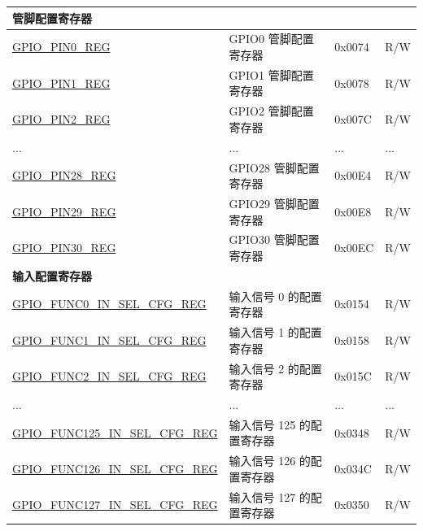 \begin{longtable}{ | p{5.8cm} | p{7.2cm} | p{1.3cm} | p{2cm} | }
\multicolumn{4}{|l|}{\textbf{管脚配置寄存器}} \\ \hline
\hyperref[regdesc:GPIOPINNREG]{GPIO\_PIN0\_REG} & GPIO0 管脚配置寄存器 & 0x0074 & R/W \\ \hline
\hyperref[regdesc:GPIOPINNREG]{GPIO\_PIN1\_REG} & GPIO1 管脚配置寄存器 & 0x0078 & R/W \\ \hline
\hyperref[regdesc:GPIOPINNREG]{GPIO\_PIN2\_REG} & GPIO2 管脚配置寄存器 & 0x007C & R/W \\ \hline
...& ... & ... & ... \\ \hline
\hyperref[regdesc:GPIOPINNREG]{GPIO\_PIN28\_REG} & GPIO28 管脚配置寄存器 & 0x00E4 & R/W \\ \hline
\hyperref[regdesc:GPIOPINNREG]{GPIO\_PIN29\_REG} & GPIO29 管脚配置寄存器 & 0x00E8 & R/W \\ \hline
\hyperref[regdesc:GPIOPINNREG]{GPIO\_PIN30\_REG} & GPIO30 管脚配置寄存器 & 0x00EC & R/W \\ \hline

\multicolumn{4}{|l|}{\textbf{输入配置寄存器}} \\ \hline
\hyperref[regdesc:GPIOFUNCNINSELCFGREG]{GPIO\_FUNC0\_IN\_SEL\_CFG\_REG} & 输入信号 0 的配置寄存器 & 0x0154 & R/W \\ \hline
\hyperref[regdesc:GPIOFUNCNINSELCFGREG]{GPIO\_FUNC1\_IN\_SEL\_CFG\_REG} & 输入信号 1 的配置寄存器 & 0x0158 & R/W \\ \hline
\hyperref[regdesc:GPIOFUNCNINSELCFGREG]{GPIO\_FUNC2\_IN\_SEL\_CFG\_REG} & 输入信号 2 的配置寄存器 & 0x015C & R/W \\ \hline
...& ... & ... & ... \\ \hline
\hyperref[regdesc:GPIOFUNCNINSELCFGREG]{GPIO\_FUNC125\_IN\_SEL\_CFG\_REG} & 输入信号 125 的配置寄存器 & 0x0348 & R/W \\ \hline
\hyperref[regdesc:GPIOFUNCNINSELCFGREG]{GPIO\_FUNC126\_IN\_SEL\_CFG\_REG} & 输入信号 126 的配置寄存器 & 0x034C & R/W \\ \hline
\hyperref[regdesc:GPIOFUNCNINSELCFGREG]{GPIO\_FUNC127\_IN\_SEL\_CFG\_REG} & 输入信号 127 的配置寄存器 & 0x0350 & R/W \\ \hline


\end{longtable}
